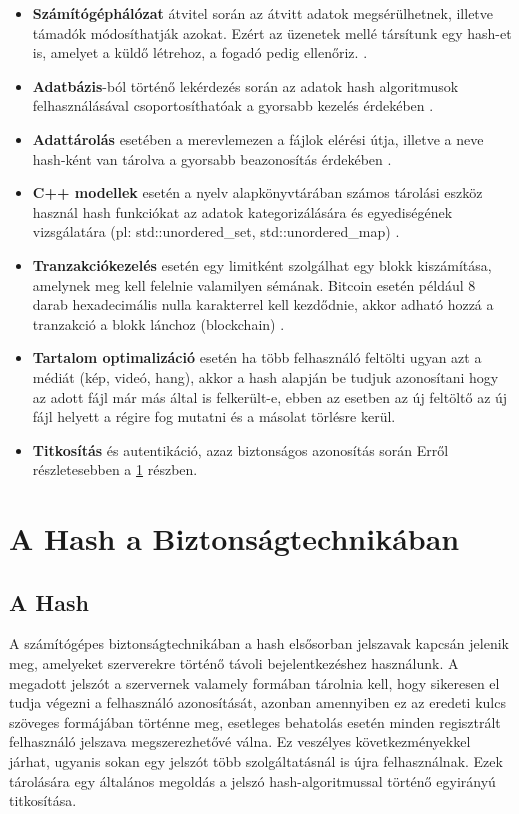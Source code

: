 \begin{itemize}
  \item \textbf{Számítógéphálózat} átvitel során az átvitt adatok megsérülhetnek, illetve támadók módosíthatják azokat. Ezért az üzenetek mellé társítunk egy hash-et is, amelyet a küldő létrehoz, a fogadó pedig ellenőriz. \cite{chen2017approach}.
  \item \textbf{Adatbázis}-ból történő lekérdezés során az adatok hash algoritmusok felhasználásával csoportosíthatóak a gyorsabb kezelés érdekében \cite{dungan2010classifying}.
  \item \textbf{Adattárolás} esetében a merevlemezen a fájlok elérési útja, illetve a neve hash-ként van tárolva a gyorsabb beazonosítás érdekében \cite{garfinkel2010using}.
  \item \textbf{C++ modellek} esetén a nyelv alapkönyvtárában számos tárolási eszköz használ hash funkciókat az adatok kategorizálására és egyediségének vizsgálatára (pl: std::unordered\_set, std::unordered\_map) \cite{guntheroth2016optimized}.
  \item \textbf{Tranzakciókezelés} esetén egy limitként szolgálhat egy blokk kiszámítása, amelynek meg kell felelnie valamilyen sémának. Bitcoin esetén például 8 darab hexadecimális nulla karakterrel kell kezdődnie, akkor adható hozzá a tranzakció a blokk lánchoz (blockchain) \cite{courtois2014optimizing}.
  \item \textbf{Tartalom optimalizáció} esetén ha több felhasználó feltölti ugyan azt a médiát (kép, videó, hang), akkor a hash alapján be tudjuk azonosítani hogy az adott fájl már más által is felkerült-e, ebben az esetben az új feltöltő az új fájl helyett a régire fog mutatni és a másolat törlésre kerül.
  \item \textbf{Titkosítás} és autentikáció, azaz biztonságos azonosítás során Erről részletesebben a \ref{sec:hash_security} részben. 
\end{itemize}



\section{A Hash a Biztonságtechnikában}
\label{sec:hash_security}

\subsection{A Hash}

A számítógépes biztonságtechnikában a hash elsősorban jelszavak kapcsán jelenik meg, amelyeket szerverekre történő távoli bejelentkezéshez használunk. A megadott jelszót a szervernek valamely formában tárolnia kell, hogy sikeresen el tudja végezni a felhasználó azonosítását, azonban amennyiben ez az eredeti kulcs szöveges formájában történne meg, esetleges behatolás esetén minden regisztrált felhasználó jelszava megszerezhetővé válna. Ez veszélyes következményekkel járhat, ugyanis sokan egy jelszót több szolgáltatásnál is újra felhasználnak. Ezek tárolására egy általános megoldás a jelszó hash-algoritmussal történő egyirányú titkosítása.



